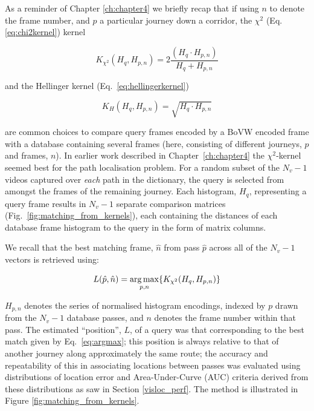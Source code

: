 As a reminder of Chapter \ref{ch:chapter4} we briefly recap that if using $n$ to denote the frame number, and $p$ a particular journey down a corridor, the 
$\chi^2$ (Eq.\ref{eq:chi2kernel}) kernel

\begin{equation}
K_{\chi^2}(H_q, H_{p,n}) =  2 \frac{(H_q \cdot H_{p,n})}{H_q+H_{p,n}}
\label{eq:chi2kernel}
\end{equation}

and the Hellinger kernel (Eq.~\ref{eq:hellingerkernel})

\begin{equation}
K_{H}(H_q, H_{p,n}) =  \sqrt{H_q \cdot H_{p,n}}
\label{eq:hellingerkernel}
\end{equation}

are common choices to compare query frames encoded by a BoVW encoded frame with a database containing several frames (here, consisting of different journeys, $p$ and frames, $n$). In earlier work described in Chapter~\ref{ch:chapter4} the $\chi^2$-kernel seemed best for the path localisation problem.   For a random subset of the $N_v-1$ videos captured over {\em each} path in the dictionary, the query is selected from amongst the frames of the remaining journey. Each histogram, $H_q$, representing a query frame results in $N_v-1$ separate comparison matrices (Fig.~\ref{fig:matching_from_kernels}), each containing the distances of each database frame histogram to the query in the form of matrix columns. 


We recall that the best matching frame, $\hat{n}$ from pass $\hat{p}$ across all of the $N_v-1$ vectors is retrieved using: 

\begin{equation}
\centering
L(\hat{p},\hat{n}) = \underset{p,n}{\arg \max} \lbrace K_{\chi^2}(H_q,H_{p,n})\rbrace
\label{eq:argmax2}
\end{equation}


$H_{p,n}$ denotes the series of normalised histogram encodings, indexed by $p$ drawn from the $N_v-1$ database passes, and $n$ denotes the frame number within that pass.  The estimated ``position'', $L$, of a query was that corresponding to the best match given by Eq.~\ref{eq:argmax}; this position is always relative to that of another journey along approximately the same route; the accuracy and repeatability of this in associating locations between passes was evaluated using distributions of location error and Area-Under-Curve (AUC) criteria derived from these distributions as saw in Section \ref{visloc_perf}. The method is illustrated in Figure \ref{fig:matching_from_kernels}.


